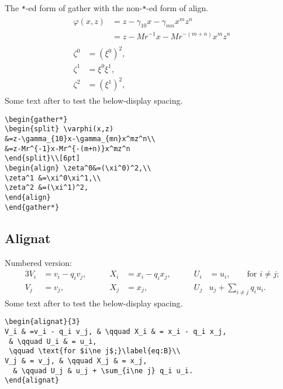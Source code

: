 \documentclass[draft]{amsart}
\newcommand{\ntt}{\normalfont\ttfamily}
\newcommand{\env}[1]{{\protect\ntt#1}}
\theoremstyle{definition}
\theoremstyle{remark}
\begin{document}
The \verb|*|-ed form of \env{gather} with the non-\verb|*|-ed form of
\env{align}.
\begin{gather*}
\begin{split} \varphi(x,z)
&=z-\gamma_{10}x-\gamma_{mn}x^mz^n\\
&=z-Mr^{-1}x-Mr^{-(m+n)}x^mz^n
\end{split}\\[6pt]
\begin{align} \zeta^0&=(\xi^0)^2,\\
\zeta^1 &=\xi^0\xi^1,\\
\zeta^2 &=(\xi^1)^2,
\end{align}
\end{gather*}
Some text after to test the below-display spacing.

\begin{verbatim}
\begin{gather*}
\begin{split} \varphi(x,z)
&=z-\gamma_{10}x-\gamma_{mn}x^mz^n\\
&=z-Mr^{-1}x-Mr^{-(m+n)}x^mz^n
\end{split}\\[6pt]
\begin{align} \zeta^0&=(\xi^0)^2,\\
\zeta^1 &=\xi^0\xi^1,\\
\zeta^2 &=(\xi^1)^2,
\end{align}
\end{gather*}
\end{verbatim}

\newpage
\subsection{Alignat}
Numbered version:
\begin{alignat}{3}
V_i & =v_i - q_i v_j, & \qquad X_i & = x_i - q_i x_j,
 & \qquad U_i & = u_i,
 \qquad \text{for $i\ne j$;}\label{eq:B}\\
V_j & = v_j, & \qquad X_j & = x_j,
  & \qquad U_j & u_j + \sum_{i\ne j} q_i u_i.
\end{alignat}
Some text after to test the below-display spacing.

\begin{verbatim}
\begin{alignat}{3}
V_i & =v_i - q_i v_j, & \qquad X_i & = x_i - q_i x_j,
 & \qquad U_i & = u_i,
 \qquad \text{for $i\ne j$;}\label{eq:B}\\
V_j & = v_j, & \qquad X_j & = x_j,
  & \qquad U_j & u_j + \sum_{i\ne j} q_i u_i.
\end{alignat}
\end{verbatim}
\end{document}
